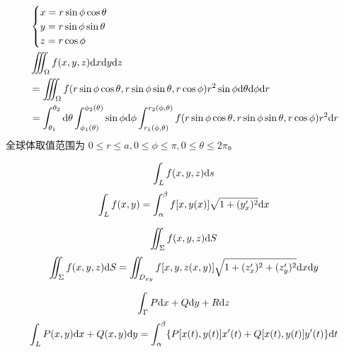 \documentclass{ctexbook}
\def\diff{\textnormal{d}}
\begin{document}
\begin{proposition}[球面坐标系]
    \begin{align}
        &\begin{cases}
            x=r\sin\phi\cos\theta\\
            y=r\sin\phi\sin\theta\\
            z=r\cos\phi
        \end{cases}\\
        &\iiint_\Omega f(x,y,z)\diff x\diff y\diff z\\
        &=\iiint_\Omega f(r\sin\phi\cos\theta,r\sin\phi\sin\theta,r\cos\phi)r^2\sin\phi\diff\theta\diff\phi\diff r\\
        &=\int_{\theta_1}^{\theta_2}\diff\theta\int_{\phi_1(\theta)}^{\phi_2(\theta)}\sin\phi\diff\phi\int_{r_1(\phi,\theta)}^{r_2(\phi,\theta)}f(r\sin\phi\cos\theta,r\sin\phi\sin\theta,r\cos\phi)r^2\diff r
    \end{align}
    全球体取值范围为 $0\leq r\leq a, 0\leq \phi\leq\pi, 0\leq\theta\leq 2\pi$。
\end{proposition}

\begin{definition}[第一类曲线积分]
    \begin{equation}
        \int_L f(x,y,z)\diff s
    \end{equation}
    \begin{equation}
        \int_L f(x,y)=\int_\alpha^\beta f[x,y(x)]\sqrt{1+(y_x^\prime)^2}\diff x
    \end{equation}
\end{definition}

\begin{definition}[第一型曲面积分]
    \begin{equation}
        \iint_\Sigma f(x,y,z)\diff S
    \end{equation}
    \begin{equation}
        \iint_\Sigma f(x,y,z)\diff S=\iint_{D_{xy}}f[x,y,z(x,y)]\sqrt{1+(z_x^\prime)^2+(z_y^\prime)^2}\diff x\diff y
    \end{equation}
\end{definition}

\begin{definition}[第二型曲线积分]
    \begin{equation}
        \int_\Gamma P\diff x+Q\diff y+R\diff z
    \end{equation}
    \begin{equation}
        \int_L P(x,y)\diff x+Q(x,y)\diff y=\int_\alpha^\beta\{P[x(t),y(t)]x^\prime(t)+Q[x(t),y(t)]y^\prime(t)\}\diff t
    \end{equation}
\end{definition}
\end{document}
